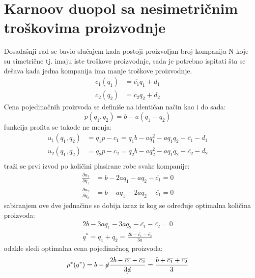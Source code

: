 \documentclass[12pt]{article}
\begin{document}
\section{Karnoov duopol sa nesimetričnim troškovima proizvodnje}
\par Dosadašnji rad se bavio slučajem kada postoji proizvoljan broj kompanija
N koje su simetrične tj. imaju iste troškove proizvodnje, sada je potrebno
ispitati šta se dešava kada jedna kompanija ima manje troškove proizvodnje.
\begin{align*}
	c_1 (q_1) &= \overline{c_1} q_1 + d_1 \\
	c_2 (q_2) &= \overline{c_2} q_2 + d_2
\end{align*}
Cena pojedinačnih proizvoda se definiše na identičan način kao i do sada:
\begin{equation*}
	p(q_1, q_2) = b - a (q_1 + q_2)
\end{equation*}
funkcija profita se takođe ne menja:
\begin{align*}
	u_1(q_1, q_2) &= q_1 p - c_1 = q_1 b - a q_1^2 - a q_1 q_2 - \overline{c_1}
	- d_1\\
	u_2(q_1, q_2) &= q_2 p - c_2 = q_2 b - a q_2^2 - a q_1 q_2 - \overline{c_2}
	- d_2\\
\end{align*}
traži se prvi izvod po količini plasirane robe svake kompanije:
\begin{align*}
	\frac{\partial u_1}{\partial q_1} &= b - 2 a q_1 - a q_2 - \overline{c_1} = 0
	\\
	\frac{\partial u_2}{\partial q_2} &= b - a q_1 - 2 a q_2 - \overline{c_1} = 0
\end{align*}
sabiranjem ove dve jednačine se dobija izraz iz kog se određuje optimalna
količina proizvoda:
\begin{gather*}
	2 b - 3 a q_1 - 3 a q_2 - \overline{c_1} - \overline{c_2} = 0 \\
	q^* = q_1 + q_2 = \frac{2 b - \overline{c_1} - \overline{c_2}}{3 a}
\end{gather*}
odakle sledi optimalna cena pojedinačnog proizvoda:
\begin{equation*}
	p^*(q^*) = b
	- \cancel{a} \frac{2 b - \overline{c_1} - \overline{c_2}}{3 \cancel{a}}
	= \frac{b + \overline{c_1} + \overline{c_2}}{3}
\end{equation*}
\end{document}
